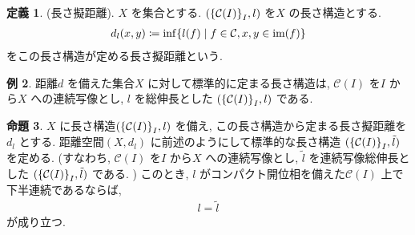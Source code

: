 \documentclass[10pt, fleqn, label-section=none]{bxjsarticle}
\theoremstyle{definition}
\newtheorem{dfn}{定義}[section]
\newtheorem{ex}[dfn]{例}
\newtheorem{prop}[dfn]{命題}
\newcommand{\cbra}[1]{\mleft\{#1\mright\}}
\renewcommand{\;}{\, ; \,}
\begin{document}
\begin{dfn}(長さ擬距離). $X$ を集合とする. $(\cbra{\mathcal C(I)}_I, l)$ を$X$ の長さ構造とする.    
\begin{align*} d_l (x, y) \coloneqq \inf \cbra{l(f) \mid f \in \mathcal C , x, y \in \textrm{im}(f) }\end{align*}
をこの長さ構造が定める長さ擬距離という. 
\end{dfn}

\begin{ex} 距離$d$ を備えた集合$X$ に対して標準的に定まる長さ構造は, $\mathcal C(I)$ を$I$ から$X$ への連続写像とし, $l$ を総伸長とした $(\cbra{ \mathcal C(I)}_I, l)$ である. 
\end{ex}

\begin{prop} $X$ に長さ構造$(\cbra{ \mathcal C(I)}_I, l)$ を備え, この長さ構造から定まる長さ擬距離を$d_l$ とする. 距離空間$(X, d_l)$ に前述のようにして標準的な長さ構造 $(\cbra{ \mathcal C(I)}_I, \tilde l)$ を定める. (すなわち, $\mathcal C(I)$ を$I$ から$X$ への連続写像とし, $\tilde l$ を連続写像総伸長とした $(\cbra{ \mathcal C(I)}_I, \tilde l)$ である. ) このとき, $l$ がコンパクト開位相を備えた$\mathcal C (I)$ 上で下半連続であるならば, 
\begin{align*} l = \tilde l \end{align*}
が成り立つ. 

\end{prop}
\end{document}
